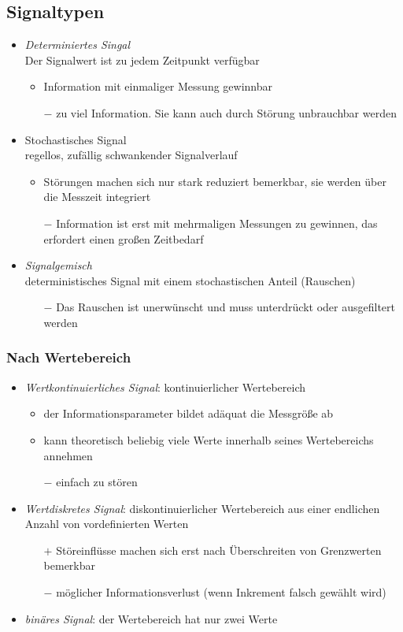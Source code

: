 \subsection{Signaltypen}
\begin{itemize}
\item \emph{Determiniertes Singal}\\
Der Signalwert ist zu jedem Zeitpunkt verfügbar
\begin{itemize}[label=$+$]
\item Information mit einmaliger Messung gewinnbar
\item[$-$] zu viel Information. Sie kann auch durch Störung unbrauchbar werden
\end{itemize}
\item Stochastisches Signal\\
regellos, zufällig schwankender Signalverlauf
\begin{itemize}[label=$+$]
\item Störungen machen sich nur stark reduziert bemerkbar, sie werden über die Messzeit integriert
\item[$-$] Information ist erst mit mehrmaligen Messungen zu gewinnen, das erfordert einen großen Zeitbedarf
\end{itemize}
\item \emph{Signalgemisch}\\
deterministisches Signal mit einem stochastischen Anteil (Rauschen)
\begin{itemize}
\item[$-$] Das Rauschen ist unerwünscht und muss unterdrückt oder ausgefiltert werden
\end{itemize}
\end{itemize}

\subsubsection{Nach Wertebereich}
\begin{itemize}
\item \emph{Wertkontinuierliches Signal}: kontinuierlicher Wertebereich
\begin{itemize}[label=$+$]
\item der Informationsparameter bildet adäquat die Messgröße ab
\item kann theoretisch beliebig viele Werte innerhalb seines Wertebereichs annehmen
\item[$-$] einfach zu stören
\end{itemize}
\item \emph{Wertdiskretes Signal}: diskontinuierlicher Wertebereich aus einer endlichen Anzahl von vordefinierten Werten
\begin{itemize}
\item[$+$] Störeinflüsse machen sich erst nach Überschreiten von Grenzwerten bemerkbar
\item[$-$] möglicher Informationsverlust (wenn Inkrement falsch gewählt wird)
\end{itemize}
\item \emph{binäres Signal}: der Wertebereich hat nur zwei Werte
\end{itemize}
